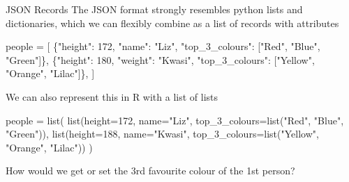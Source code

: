 \documentclass[
  10pt,
  ignorenonframetext,
  aspectratio=169]{beamer}
\newenvironment{Shaded}{\begin{snugshade}}{\end{snugshade}}
\newcommand{\AttributeTok}[1]{\textcolor[rgb]{0.80,0.80,0.80}{#1}}
\newcommand{\DecValTok}[1]{\textcolor[rgb]{0.86,0.86,0.80}{#1}}
\newcommand{\FunctionTok}[1]{\textcolor[rgb]{0.94,0.94,0.56}{#1}}
\newcommand{\NormalTok}[1]{\textcolor[rgb]{0.80,0.80,0.80}{#1}}
\newcommand{\OperatorTok}[1]{\textcolor[rgb]{0.94,0.94,0.82}{#1}}
\newcommand{\OtherTok}[1]{\textcolor[rgb]{0.94,0.94,0.56}{#1}}
\newcommand{\StringTok}[1]{\textcolor[rgb]{0.80,0.58,0.58}{#1}}
\begin{document}
\begin{frame}[fragile]{JSON Records}
\protect\hypertarget{json-records}{}
The JSON format strongly resembles python lists and dictionaries, which
we can flexibly combine as a list of records with attributes

\scriptsize

\begin{Shaded}
\begin{Highlighting}[]
\NormalTok{people }\OperatorTok{=}\NormalTok{ [}
\NormalTok{  \{}\StringTok{"height"}\NormalTok{: }\DecValTok{172}\NormalTok{, }\StringTok{"name"}\NormalTok{: }\StringTok{"Liz"}\NormalTok{, }\StringTok{"top\_3\_colours"}\NormalTok{: [}\StringTok{"Red"}\NormalTok{, }\StringTok{"Blue"}\NormalTok{, }\StringTok{"Green"}\NormalTok{]\},}
\NormalTok{  \{}\StringTok{"height"}\NormalTok{: }\DecValTok{180}\NormalTok{, }\StringTok{"weight"}\NormalTok{: }\StringTok{"Kwasi"}\NormalTok{, }\StringTok{"top\_3\_colours"}\NormalTok{: [}\StringTok{"Yellow"}\NormalTok{, }\StringTok{"Orange"}\NormalTok{, }\StringTok{"Lilac"}\NormalTok{]\},}
\NormalTok{]}
\end{Highlighting}
\end{Shaded}

\medskip
\normalsize

We can also represent this in R with a list of lists

\scriptsize

\begin{Shaded}
\begin{Highlighting}[]
\NormalTok{people }\OtherTok{=} \FunctionTok{list}\NormalTok{(}
  \FunctionTok{list}\NormalTok{(}\AttributeTok{height=}\DecValTok{172}\NormalTok{, }\AttributeTok{name=}\StringTok{"Liz"}\NormalTok{, }\AttributeTok{top\_3\_colours=}\FunctionTok{list}\NormalTok{(}\StringTok{"Red"}\NormalTok{, }\StringTok{"Blue"}\NormalTok{, }\StringTok{"Green"}\NormalTok{)),}
  \FunctionTok{list}\NormalTok{(}\AttributeTok{height=}\DecValTok{188}\NormalTok{, }\AttributeTok{name=}\StringTok{"Kwasi"}\NormalTok{, }\AttributeTok{top\_3\_colours=}\FunctionTok{list}\NormalTok{(}\StringTok{"Yellow"}\NormalTok{, }\StringTok{"Orange"}\NormalTok{, }\StringTok{"Lilac"}\NormalTok{))}
\NormalTok{)}
\end{Highlighting}
\end{Shaded}

\normalsize

How would we get or set the 3rd favourite colour of the 1st person?
\end{frame}
\end{document}
